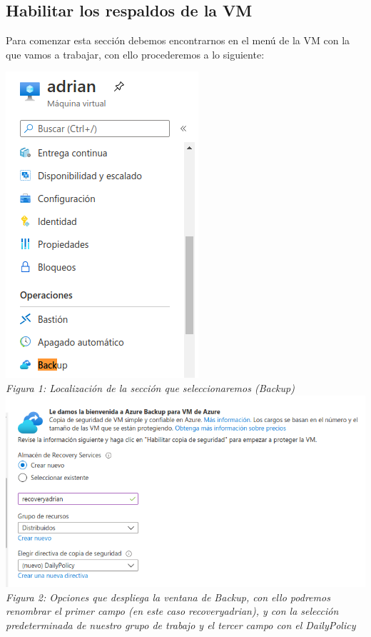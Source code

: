 \documentclass[10pt,executivepaper]{article}
\begin{document}
\subsection{Habilitar los respaldos de la VM}
Para comenzar esta sección debemos encontrarnos en el menú de la VM con la que vamos a trabajar, con ello procederemos a lo siguiente:
\begin{center}
  \includegraphics[scale=0.75]{imgs/1.png}\\
  \textit{Figura 1: Localización de la sección que seleccionaremos (Backup)}\\
  \clearpage
  \includegraphics[scale=0.5]{imgs/2.png}\\
  \textit{Figura 2: Opciones que despliega la ventana de Backup, con ello podremos renombrar el primer campo (en este caso recoveryadrian), y con la selección predeterminada de nuestro grupo de trabajo y el tercer campo con el DailyPolicy}\\

\end{center}
\end{document}
